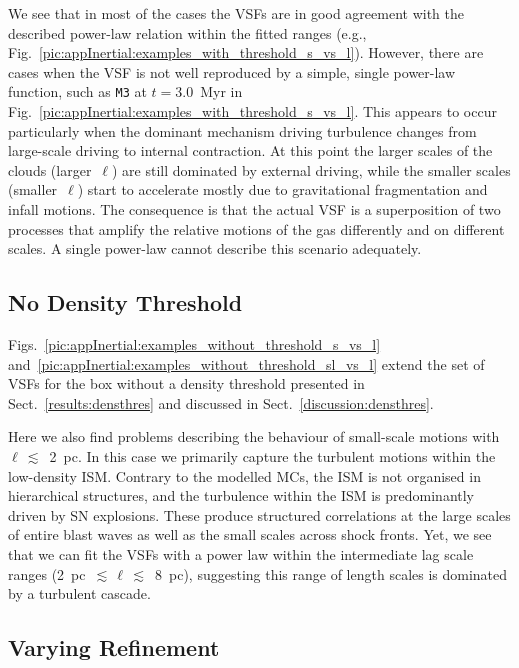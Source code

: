 We see that in most of the cases the VSFs are in good agreement with the described power-law relation within the fitted ranges (e.g., Fig.~\ref{pic:appInertial:examples_with_threshold_s_vs_l}). 
However, there are cases when the VSF is not well reproduced by a simple, single power-law function, such as \texttt{M3} at $t=3.0$~Myr in Fig.~\ref{pic:appInertial:examples_with_threshold_s_vs_l}.
This appears to occur particularly when the dominant mechanism driving turbulence changes from large-scale driving to internal contraction. 
At this point the  larger scales of the clouds (larger~$\ell$) are still dominated by external driving, while the smaller scales (smaller~$\ell$) start to accelerate mostly due to gravitational fragmentation and infall motions.
The consequence is that the actual VSF is a superposition of two processes that amplify the relative motions of the gas differently and on different scales.
A single power-law cannot describe this scenario adequately. 


\subsection{No Density Threshold} \label{Bsub:full}

Figs.~\ref{pic:appInertial:examples_without_threshold_s_vs_l} and~\ref{pic:appInertial:examples_without_threshold_sl_vs_l} extend the set of VSFs for the box without a density threshold presented in Sect.~\ref{results:densthres} and discussed in Sect.~\ref{discussion:densthres}.

Here we also find problems describing the behaviour of small-scale motions with $\ell\,\lesssim$~2~pc.
In this case we primarily capture the turbulent motions within the low-density ISM. 
Contrary to the modelled MCs, the ISM is not organised in hierarchical structures, and the turbulence within the ISM is predominantly driven by SN explosions.
These produce structured correlations at the large scales of entire blast waves as well as the small scales across shock fronts.
Yet, we see that we can fit the VSFs with a power law within the intermediate lag scale ranges (2~pc~$\lesssim\,\ell\,\lesssim$~8~pc), suggesting this range of length scales is dominated by a turbulent cascade.



\subsection{Varying Refinement} \label{Bsub:Jeans}

